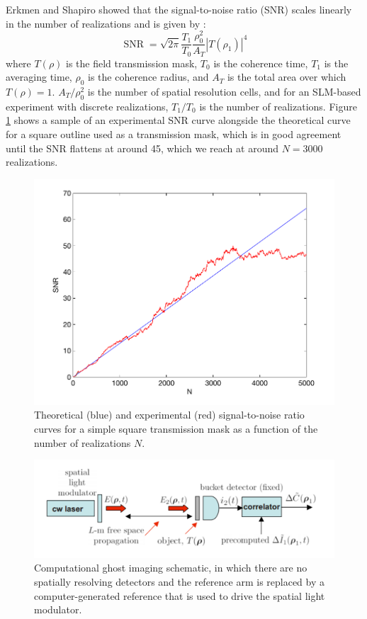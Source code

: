 Erkmen and Shapiro showed that the signal-to-noise ratio (SNR) scales linearly in the number of realizations and is given by \cite{erkmen-signal,erkmen-from}:
\begin{equation}
\operatorname{SNR} = \sqrt{2\pi} \frac{T_1}{T_0} \frac{\rho_0^2}{A_T} |T(\rho_1)|^4
\end{equation}
where $T(\rho)$ is the field transmission mask, $T_0$ is the coherence time, $T_1$ is the averaging time, $\rho_0$ is the coherence radius, and $A_T$ is the total area over which $T(\rho) = 1$. $A_T/\rho_0^2$ is the number of spatial resolution cells, and for an SLM-based experiment with discrete realizations, $T_1/T_0$ is the number of realizations. Figure \ref{figure:ghost-snr} shows a sample of an experimental SNR curve alongside the theoretical curve for a square outline used as a transmission mask, which is in good agreement until the SNR flattens at around 45, which we reach at around $N=3000$ realizations.

\begin{figure}[htb]
\centerline{\includegraphics[width=12cm]{figure-ghost-snr.pdf}}
\caption{Theoretical (blue) and experimental (red) signal-to-noise ratio curves for a simple square transmission mask as a function of the number of realizations $N$.}
\label{figure:ghost-snr}
\end{figure}

\begin{figure}[htb]
\centerline{\includegraphics[width=12cm]{figure-ghost-computational-schematic.pdf}}
\caption{Computational ghost imaging schematic, in which there are no spatially resolving detectors and the reference arm is replaced by a computer-generated reference that is used to drive the spatial light modulator.}
\label{figure:ghost-computational-schematic}
\end{figure}

